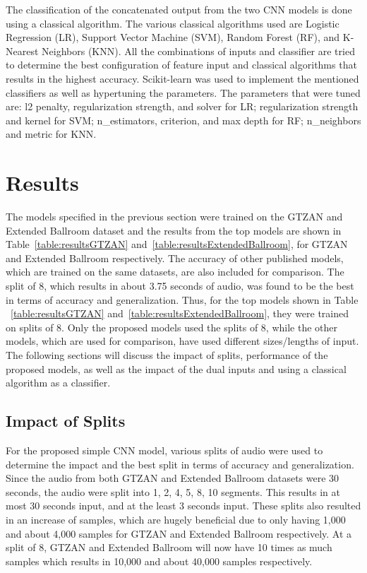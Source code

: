 \documentclass[10pt,twocolumn,letterpaper]{article}
\begin{document}
	The classification of the concatenated output from the two CNN models is done using a classical algorithm. The various classical algorithms used are Logistic Regression (LR), Support Vector Machine (SVM), Random Forest (RF), and K-Nearest Neighbors (KNN). All the combinations of inputs and classifier are tried to determine the best configuration of feature input and classical algorithms that results in the highest accuracy. Scikit-learn was used to implement the mentioned classifiers as well as hypertuning the parameters. The parameters that were tuned are: l2 penalty, regularization strength, and solver for LR; regularization strength and kernel for SVM; n\_estimators, criterion, and max depth for RF; n\_neighbors and metric for KNN.
	
	\section{Results} %
	
	The models specified in the previous section were trained on the GTZAN and Extended Ballroom dataset and the results from the top models are shown in Table~\ref{table:resultsGTZAN} and~\ref{table:resultsExtendedBallroom}, for GTZAN and Extended Ballroom respectively. The accuracy of other published models, which are trained on the same datasets, are also included for comparison. The split of 8, which results in about 3.75 seconds of audio, was found to be the best in terms of accuracy and generalization. Thus, for the top models shown in Table ~\ref{table:resultsGTZAN} and~\ref{table:resultsExtendedBallroom}, they were trained on splits of 8. Only the proposed models used the splits of 8, while the other models, which are used for comparison, have used different sizes/lengths of input. The following sections will discuss the impact of splits, performance of the proposed models, as well as the impact of the dual inputs and using a classical algorithm as a classifier.
	
	\subsection{Impact of Splits} %
	
	For the proposed simple CNN model, various splits of audio were used to determine the impact and the best split in terms of accuracy and generalization. Since the audio from both GTZAN and Extended Ballroom datasets were 30 seconds, the audio were split into 1, 2, 4, 5, 8, 10 segments. This results in at most 30 seconds input, and at the least 3 seconds input. These splits also resulted in an increase of samples, which are hugely beneficial due to only having 1,000 and about 4,000 samples for GTZAN and Extended Ballroom respectively. At a split of 8, GTZAN and Extended Ballroom will now have 10 times as much samples which results in 10,000 and about 40,000 samples respectively.
	
\end{document}
